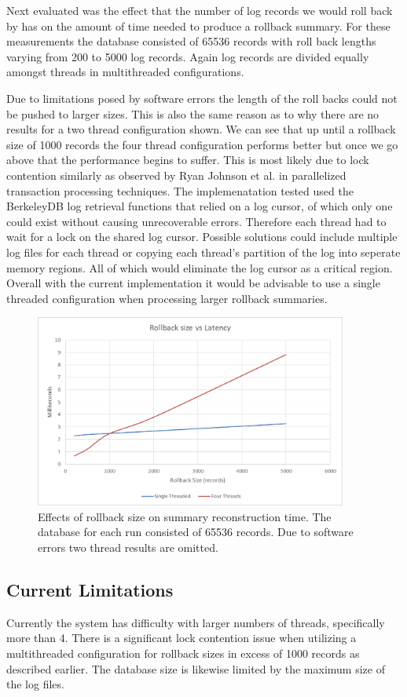 \documentclass{article}
\begin{document}
Next evaluated was the effect that the number of log records we would roll back by has on the amount of time needed to produce a rollback summary. For these measurements the database consisted of 65536 records with roll back lengths varying from 200 to 5000 log records. Again log records are divided equally amongst threads in multithreaded configurations.

Due to limitations posed by software errors the length of the roll backs could not be pushed to larger sizes. This is also the same reason as to why there are no results for a two thread configuration shown. We can see that up until a rollback size of 1000 records the four thread configuration performs better but once we go above that the performance begins to suffer. This is most likely due to lock contention similarly as observed by Ryan Johnson et al. in parallelized transaction processing techniques\cite{transaction}. The implemenatation tested used the BerkeleyDB log retrieval functions that relied on a log cursor, of which only one could exist without causing unrecoverable errors. Therefore each thread had to wait for a lock on the shared log cursor. Possible solutions could include multiple log files for each thread or copying each thread's partition of the log into seperate memory regions. All of which would eliminate the log cursor as a critical region. Overall with the current implementation it would be advisable to use a single threaded configuration when processing larger rollback summaries.  

\begin{figure}
    \centering
    \includegraphics[height=2.5in]{sizevslatency.png}
    \caption{Effects of rollback size on summary reconstruction time. The database for each run consisted of 65536 records. Due to software errors two thread results are omitted.}
    \label{fig:RollbackSize}
\end{figure}
\subsection{Current Limitations}
Currently the system has difficulty with larger numbers of threads, specifically more than 4. There is a significant lock contention issue when utilizing a multithreaded configuration for rollback sizes in excess of 1000 records as described earlier. The database size is likewise limited by the maximum size of the log files.
\end{document}
